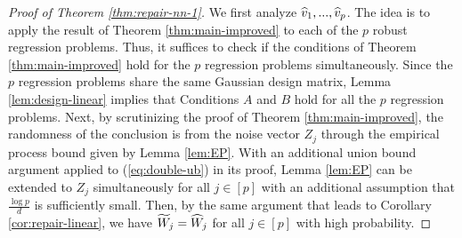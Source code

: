 \begin{proof}[Proof of Theorem \ref{thm:repair-nn-1}]
We first analyze $\widehat{v}_1,...,\widehat{v}_p$. The idea is to apply the result of Theorem \ref{thm:main-improved} to each of the $p$ robust regression problems. Thus, it suffices to check if the conditions of Theorem \ref{thm:main-improved} hold for the $p$ regression problems simultaneously. Since the $p$ regression problems share the same Gaussian design matrix, Lemma \ref{lem:design-linear} implies that Conditions $A$ and $B$ hold for all the $p$ regression problems. Next, by scrutinizing the proof of Theorem \ref{thm:main-improved}, the randomness of the conclusion is from the noise vector $Z_j$ through the empirical process bound given by Lemma \ref{lem:EP}. With an additional union bound argument applied to (\ref{eq:double-ub}) in its proof, Lemma \ref{lem:EP} can be extended to $Z_j$ simultaneously for all $j\in[p]$ with an additional assumption that $\frac{\log p}{d}$ is sufficiently small. Then, by the same argument that leads to Corollary \ref{cor:repair-linear}, we have $\widetilde{W}_j=\widehat{W}_j$ for all $j\in[p]$ with high probability.


\end{proof}

